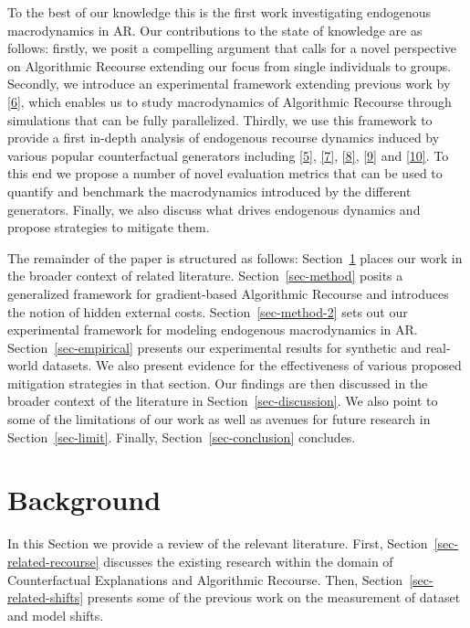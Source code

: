 \documentclass[
  conference]{IEEEtran}
\begin{document}
To the best of our knowledge this is the first work investigating
endogenous macrodynamics in AR. Our contributions to the state of
knowledge are as follows: firstly, we posit a compelling argument that
calls for a novel perspective on Algorithmic Recourse extending our
focus from single individuals to groups. Secondly, we introduce an
experimental framework extending previous work by
\protect\hyperlink{ref-altmeyer2022CounterfactualExplanations}{{[}6{]}},
which enables us to study macrodynamics of Algorithmic Recourse through
simulations that can be fully parallelized. Thirdly, we use this
framework to provide a first in-depth analysis of endogenous recourse
dynamics induced by various popular counterfactual generators including
\protect\hyperlink{ref-wachter2017counterfactual}{{[}5{]}},
\protect\hyperlink{ref-schut2021generating}{{[}7{]}},
\protect\hyperlink{ref-joshi2019towards}{{[}8{]}},
\protect\hyperlink{ref-mothilal2020explaining}{{[}9{]}} and
\protect\hyperlink{ref-antoran2020getting}{{[}10{]}}. To this end we
propose a number of novel evaluation metrics that can be used to
quantify and benchmark the macrodynamics introduced by the different
generators. Finally, we also discuss what drives endogenous dynamics and
propose strategies to mitigate them.

The remainder of the paper is structured as follows:
Section~\ref{sec-related} places our work in the broader context of
related literature. Section~\ref{sec-method} posits a generalized
framework for gradient-based Algorithmic Recourse and introduces the
notion of hidden external costs. Section~\ref{sec-method-2} sets out our
experimental framework for modeling endogenous macrodynamics in AR.
Section~\ref{sec-empirical} presents our experimental results for
synthetic and real-world datasets. We also present evidence for the
effectiveness of various proposed mitigation strategies in that section.
Our findings are then discussed in the broader context of the literature
in Section~\ref{sec-discussion}. We also point to some of the
limitations of our work as well as avenues for future research in
Section~\ref{sec-limit}. Finally, Section~\ref{sec-conclusion}
concludes.

\hypertarget{sec-related}{%
\section{Background}\label{sec-related}}

In this Section we provide a review of the relevant literature. First,
Section~\ref{sec-related-recourse} discusses the existing research
within the domain of Counterfactual Explanations and Algorithmic
Recourse. Then, Section~\ref{sec-related-shifts} presents some of the
previous work on the measurement of dataset and model shifts.
\end{document}
